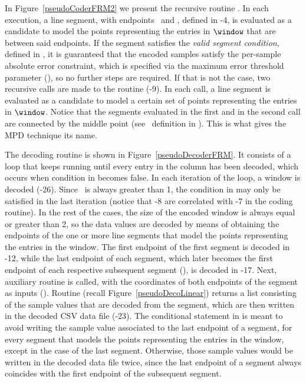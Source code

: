 


\vspace{-4pt}
In Figure~\ref{pseudoCoderFRM2} we present the recursive routine \getDisplacedPointsMethod. In each execution, a line segment, with endpoints \pointo\ and \pointf, defined in -4, is evaluated as a candidate to model the points representing the entries in $\window$ that are between said endpoints. If the segment satisfies the \textit{valid segment condition}, defined in , it is guaranteed that the encoded samples satisfy the per-sample absolute error constraint, which is specified via the maximum error threshold parameter (\maxerror), so no further steps are required. If that is not the case, two recursive calls are made to the routine (-9). In each call, a line segment is evaluated as a candidate to model a certain set of points representing the entries in $\window$. Notice that the segments evaluated in the first and in the second call are connected by the middle point (see \half\ definition in ). This is what gives the MPD technique its name.





\clearpage


The decoding routine is shown in Figure~\ref{pseudoDecoderFRM}. It consists of a loop that keeps running until every entry in the column has been decoded, which occurs when condition in  becomes false. In each iteration of the loop, a window is decoded (-26). Since \win\ is always greater than 1, the condition in  may only be satisfied in the last iteration (notice that -8 are correlated with -7 in the coding routine). In the rest of the cases, the size of the encoded window is always equal or greater than 2, so the data values are decoded by means of obtaining the endpoints of the one or more line segments that model the points representing the entries in the window. The first endpoint of the first segment is decoded in -12, while the last endpoint of each segment, which later becomes the first endpoint of each respective subsequent segment (), is decoded in -17. Next, auxiliary routine \decodeSegment is called, with the coordinates of both endpoints of the segment as inputs (). Routine \decodeSegment (recall Figure~\ref{pseudoDecoLinear}) returns a list consisting of the sample values that are decoded from the segment, which are then written in the decoded CSV data file (-23). The conditional statement in  is meant to avoid writing the sample value associated to the last endpoint of a segment, for every segment that models the points representing the entries in the window, except in the case of the last segment. Otherwise, those sample values would be written in the decoded data file twice, since the last endpoint of a segment always coincides with the first endpoint of the subsequent segment.


